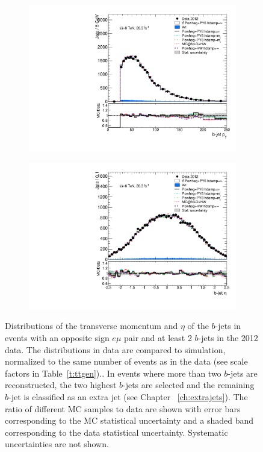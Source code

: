 \begin{figure}
\centering
\begin{subfigure}[]{0.45\textwidth}
\includegraphics[width=\textwidth]{fig/MCComp/NLO/BJetPt.pdf}
\end{subfigure}
\begin{subfigure}[]{0.45\textwidth}
\includegraphics[width=\textwidth]{fig/MCComp/NLO/BJetEta.pdf}
\end{subfigure}

\caption{Distributions of the transverse momentum and $\eta$ of the $b$-jets in events with an opposite sign $e\mu$ pair  and at least 2 $b$-jets in the 2012 data. The distributions in data are compared to simulation, normalized to the same number of events as in the data  (see scale factors in Table~\ref{t:ttgen}).. In events where more than two $b$-jets are reconstructed, the two highest \pt $b$-jets are selected and the remaining $b$-jet is classified as an extra jet (see Chapter ~\ref{ch:extrajets}). The ratio of different MC samples to data are shown with error bars corresponding to the MC statistical uncertainty and a shaded band corresponding to the data statistical uncertainty. Systematic uncertainties are not shown.}
\label{fig:bjet}
\end{figure}

